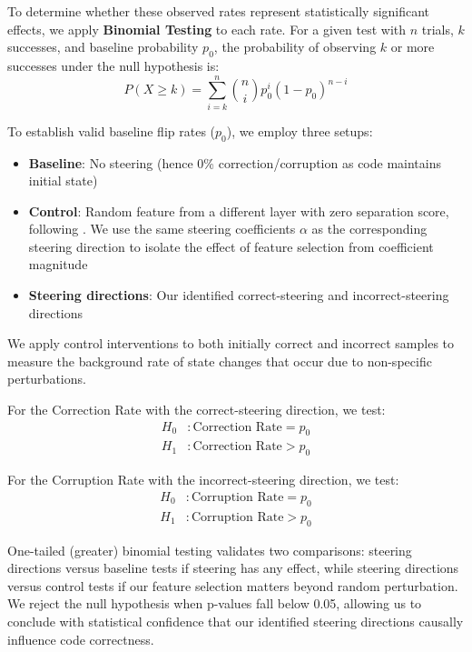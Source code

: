 To determine whether these observed rates represent statistically significant effects, we apply \textbf{Binomial Testing} to each rate. For a given test with $n$ trials, $k$ successes, and baseline probability $p_0$, the probability of observing $k$ or more successes under the null hypothesis is:
\begin{equation}
P(X \geq k) = \sum_{i=k}^{n} \binom{n}{i} p_0^i (1-p_0)^{n-i}
\end{equation}

To establish valid baseline flip rates ($p_0$), we employ three setups:

\begin{itemize}
    \item \textbf{Baseline}: No steering (hence 0\% correction/corruption as code maintains initial state)
    \item \textbf{Control}: Random feature from a different layer with zero separation score, following . We use the same steering coefficients $\alpha$ as the corresponding steering direction to isolate the effect of feature selection from coefficient magnitude
    \item \textbf{Steering directions}: Our identified correct-steering and incorrect-steering directions
\end{itemize}

We apply control interventions to both initially correct and incorrect samples to measure the background rate of state changes that occur due to non-specific perturbations.

For the Correction Rate with the correct-steering direction, we test:
\begin{align}
H_0&: \text{Correction Rate} = p_0 \\
H_1&: \text{Correction Rate} > p_0
\end{align}


For the Corruption Rate with the incorrect-steering direction, we test:
\begin{align}
H_0&: \text{Corruption Rate} = p_0 \\
H_1&: \text{Corruption Rate} > p_0
\end{align}

One-tailed (greater) binomial testing validates two comparisons: steering directions versus baseline tests if steering has any effect, while steering directions versus control tests if our feature selection matters beyond random perturbation. We reject the null hypothesis when p-values fall below 0.05, allowing us to conclude with statistical confidence that our identified steering directions causally influence code correctness.

